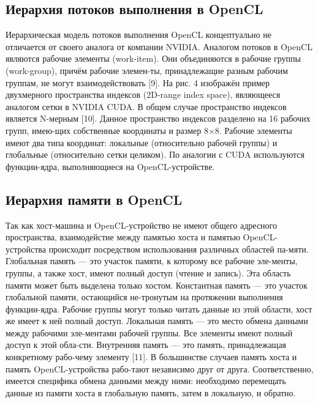 \subsection{Иерархия потоков выполнения в OpenCL}
Иерархическая модель потоков выполнения OpenCL концептуально не отличается от своего аналога от компании NVIDIA.
Аналогом потоков в OpenCL являются рабочие элементы (work-item). Они объединяются в рабочие группы (work-group), причём рабочие элемен-ты, принадлежащие разным рабочим группам, не могут взаимодействовать [9].
На рис. 4 изображён пример двухмерного пространства индексов (2D-range index space), являющееся аналогом сетки в NVIDIA CUDA. В общем случае пространство индексов является N-мерным [10].
Данное пространство индексов разделено на 16 рабочих групп, имею-щих собственные координаты и размер 8×8. Рабочие элементы имеют два типа координат: локальные (относительно рабочей группы) и глобальные (относительно сетки целиком).
По аналогии с CUDA используются функции-ядра, выполняющиеся на OpenCL-устройстве.
\subsection{Иерархия памяти в OpenCL}
Так как хост-машина и OpenCL-устройство не имеют общего адресного пространства, взаимодейстие между памятью хоста и памятью OpenCL-устройства происходит посредством использования различных областей па-мяти.
Глобальная память — это участок памяти, к которому все рабочие эле-менты, группы, а также хост, имеют полный доступ (чтение и запись). Эта область памяти может быть выделена только хостом.
Константная память — это участок глобальной памяти, остающийся не-тронутым на протяжении выполнения функции-ядра. Рабочие группы могут только читать данные из этой области, хост же имеет к ней полный доступ.
Локальная память — это место обмена данными между рабочими эле-ментами рабочей группы. Все элементы имеют полный доступ к этой обла-сти.
Внутренняя память — это память, принадлежащая конкретному рабо-чему элементу [11].
В большинстве случаев память хоста и память OpenCL-устройства рабо-тают независимо друг от друга. Соответственно, имеется специфика обмена данными между ними: необходимо перемещать данные из памяти хоста в глобальную память, затем в локальную, и обратно.
